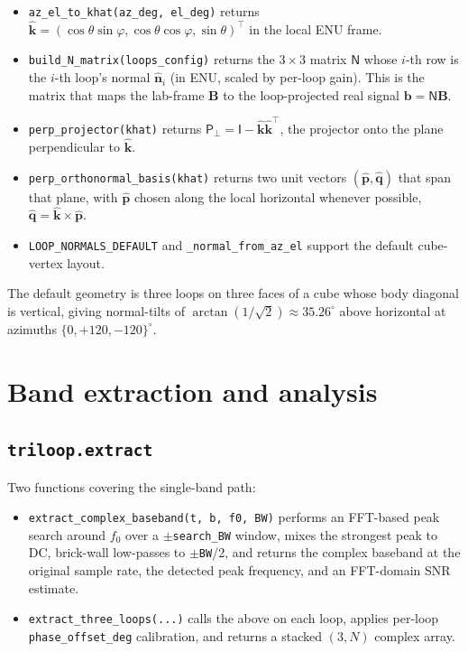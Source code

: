 \documentclass[11pt]{article}
\begin{document}
\begin{itemize}\itemsep=2pt
\item \texttt{az\_el\_to\_khat(az\_deg, el\_deg)} returns
      $\hat{\mathbf k} = (\cos\theta\sin\varphi, \cos\theta\cos\varphi,
      \sin\theta)^\top$ in the local ENU frame.
\item \texttt{build\_N\_matrix(loops\_config)} returns the $3\times 3$
      matrix $\mathsf{N}$ whose $i$-th row is the $i$-th loop's normal
      $\hat{\mathbf n}_i$ (in ENU, scaled by per-loop gain).  This is
      the matrix that maps the lab-frame $\mathbf B$ to the
      loop-projected real signal $\mathbf b = \mathsf{N}\mathbf B$.
\item \texttt{perp\_projector(khat)} returns
      $\mathsf{P}_\perp = \mathsf{I} - \hat{\mathbf k}\hat{\mathbf k}^\top$,
      the projector onto the plane perpendicular to $\hat{\mathbf k}$.
\item \texttt{perp\_orthonormal\_basis(khat)} returns two unit vectors
      $(\hat{\mathbf p}, \hat{\mathbf q})$ that span that plane, with
      $\hat{\mathbf p}$ chosen along the local horizontal whenever
      possible, $\hat{\mathbf q} = \hat{\mathbf k}\times\hat{\mathbf p}$.
\item \texttt{LOOP\_NORMALS\_DEFAULT} and \texttt{\_normal\_from\_az\_el}
      support the default cube-vertex layout.
\end{itemize}

The default geometry is three loops on three faces of a cube whose
body diagonal is vertical, giving normal-tilts of $\arctan(1/\sqrt{2})
\approx 35.26^\circ$ above horizontal at azimuths $\{0, +120, -120\}^\circ$.

\section{Band extraction and analysis}

\subsection{\texttt{triloop.extract}}

Two functions covering the single-band path:

\begin{itemize}\itemsep=2pt
\item \texttt{extract\_complex\_baseband(t, b, f0, BW)} performs an
      FFT-based peak search around $f_0$ over a $\pm$\texttt{search\_BW}
      window, mixes the strongest peak to DC, brick-wall low-passes to
      $\pm$\texttt{BW}/2, and returns the complex baseband at the
      original sample rate, the detected peak frequency, and an
      FFT-domain SNR estimate.
\item \texttt{extract\_three\_loops(...)} calls the above on each loop,
      applies per-loop \texttt{phase\_offset\_deg} calibration, and
      returns a stacked $(3, N)$ complex array.
\end{itemize}
\end{document}
